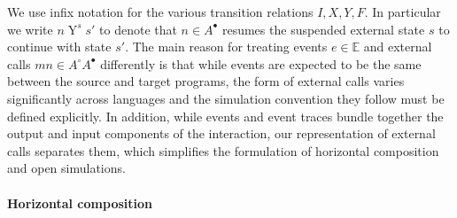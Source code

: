 \documentclass[draft,11pt]{report}
\newcommand{\kw}[1]{\ensuremath{ \mathsf{#1} }}
\newcommand{\que}{\circ}         %
\newcommand{\ans}{\bullet}       %
\begin{document}
We use infix notation for the various transition relations
$I, X, Y, F$.
In particular we write $n \mathrel{Y}^s s'$
to denote that $n \in A^\ans$
resumes the suspended external state $s$
to continue with state $s'$.
%
The main reason for treating
events $e \in \mathbb{E}$ and
external calls $m n \in A^\que A^\ans$
differently is that
while events are expected to be the same
between the source and target programs,
the form of external calls varies significantly
across languages
and the simulation convention they follow
must be defined explicitly.
In addition,
while events and event traces
bundle together the output and input
components of the interaction,
our representation of external calls
separates them,
which simplifies the formulation of
horizontal composition and open simulations.



\paragraph{Horizontal composition} \label{sec:sem:linker} %
\end{document}
